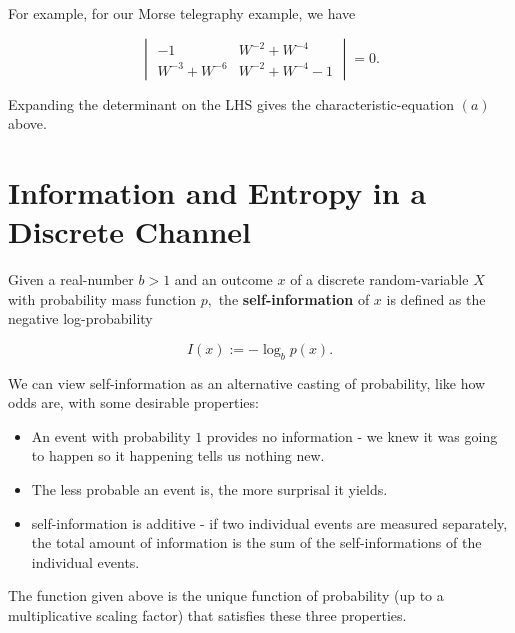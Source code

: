 \documentclass{article}
\begin{document}
\begin{example}
For example, for our Morse telegraphy example, we have

\[ \begin{vmatrix} -1 & W^{-2} + W^{-4} \\ W^{-3} + W^{-6} & W^{-2} + W^{-4} - 1 \end{vmatrix} = 0. \]

Expanding the \@{determinant} on the LHS gives the \@{characteristic-equation} $(a)$ above.
\end{example}

\section{Information and Entropy in a Discrete Channel}

\begin{definition}
Given a \@{real-number} $b > 1$ and an outcome $x$ of a discrete \@{random-variable} $X$ with probability mass function $p,$ the \textbf{self-information} of $x$ is defined as the negative \@{log-probability}

\[ I(x) := - \log_{b}{p(x)}. \]
\end{definition}

\begin{remark}
We can view \@{self-information} as an alternative casting of \@{probability}, like how \@{odds} are, with some desirable properties:

\begin{itemize}
\item An event with probability $1$ provides no information - we knew it was going to happen so it happening tells us nothing new.
\end{itemize}

\begin{itemize}
\item The less probable an event is, the more \@{surprisal} it yields.
\end{itemize}

\begin{itemize}
\item \@{self-information} is \@{additive} - if two individual events are measured separately, the total amount of information is the sum of the \@{self-informations} of the individual events.
\end{itemize}

The function given above is the unique function of probability (up to a multiplicative scaling factor) that satisfies these three properties.
\end{remark}
\end{document}
